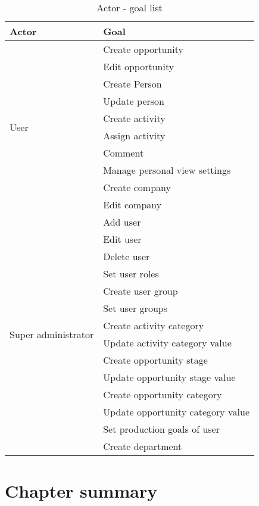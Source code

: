 \begin{table}
  \begin{tabular}{l|l}
    Actor & Goal \\ \hline
    \multirow{10}{*}{User}
    & Create opportunity \\
    & Edit opportunity \\
    & Create Person \\
    & Update person \\
    & Create activity \\
    & Assign activity \\
    & Comment \\
    & Manage personal view settings \\
    & Create company \\
    & Edit company \\
    \hline
    \multirow{14}{*}{Super administrator}
    & Add user \\
    & Edit user \\
    & Delete user \\
    & Set user roles \\
    & Create user group \\
    & Set user groups \\
    & Create activity category \\
    & Update activity category value \\
    & Create opportunity stage \\
    & Update opportunity stage value \\
    & Create opportunity category \\
    & Update opportunity category value \\
    & Set production goals of user \\
    & Create department
  \end{tabular}
  \caption{Actor - goal list}
  \label{tab:actor-loal-list}
\end{table}


\section{Chapter summary}
